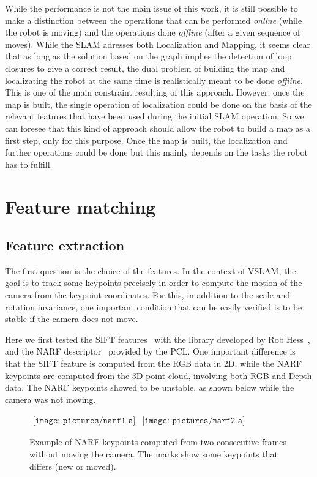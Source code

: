 While the performance is not the main issue of this work, it is still possible to make a distinction between the operations that can be performed \emph{online} (while the robot is moving) and the operations done \emph{offline} (after a given sequence of moves). While the \gls{SLAM} adresses both Localization and Mapping, it seems clear that as long as the solution based on the graph implies the detection of loop closures to give a correct result, the dual problem of building the map and localizating the robot at the same time is realistically meant to be done \emph{offline}. This is one of the main constraint resulting of this approach. However, once the map is built, the single operation of localization could be done on the basis of the relevant features that have been used during the initial \gls{SLAM} operation. So we can foresee that this kind of approach should allow the robot to build a map as a first step, only for this purpose. Once the map is built, the localization and further operations could be done but this mainly depends on the tasks the robot has to fulfill.

\chapter{Feature matching}
\label{chap:features}

\section{Feature extraction}

The first question is the choice of the features. In the context of \gls{VSLAM}, the goal is to track some keypoints precisely in order to compute the motion of the camera from the keypoint coordinates. For this, in addition to the scale and rotation invariance, one important condition that can be easily verified is to be stable if the camera does not move. 

Here we first tested the \gls{SIFT} features~\cite{lowe_2004_sift} with the library developed by Rob Hess~\cite{hess_sift}, and the \gls{NARF} descriptor~\cite{steder10irosws} provided by the \gls{PCL}. One important difference is that the \gls{SIFT} feature is computed from the RGB data in 2D, while the \gls{NARF} keypoints are computed from the 3D point cloud, involving both RGB and Depth data.
The \gls{NARF} keypoints showed to be unstable, as shown below while the camera was not moving.

\begin{figure}[h]
\centering$
 \begin{array}{cc}
 \texttt{[image: pictures/narf1\_a]} &
 \texttt{[image: pictures/narf2\_a]}
 \end{array}$
\caption{Example of NARF keypoints computed from two consecutive frames without moving the camera. The marks show some keypoints that differs (new or moved).}
\end{figure}

